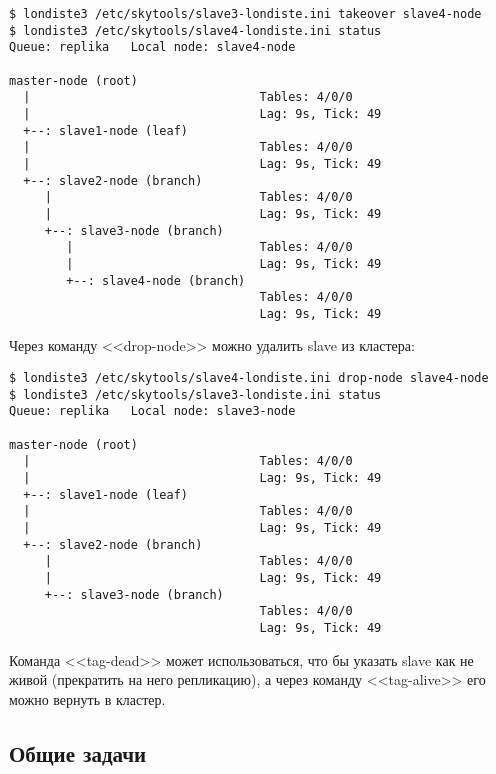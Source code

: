 \begin{lstlisting}[label=lst:londiste-cascade8,caption=Изменяем топологию]
$ londiste3 /etc/skytools/slave3-londiste.ini takeover slave4-node
$ londiste3 /etc/skytools/slave4-londiste.ini status
Queue: replika   Local node: slave4-node

master-node (root)
  |                                Tables: 4/0/0
  |                                Lag: 9s, Tick: 49
  +--: slave1-node (leaf)
  |                                Tables: 4/0/0
  |                                Lag: 9s, Tick: 49
  +--: slave2-node (branch)
     |                             Tables: 4/0/0
     |                             Lag: 9s, Tick: 49
     +--: slave3-node (branch)
        |                          Tables: 4/0/0
        |                          Lag: 9s, Tick: 49
        +--: slave4-node (branch)
                                   Tables: 4/0/0
                                   Lag: 9s, Tick: 49
\end{lstlisting}

Через команду <<drop-node>> можно удалить slave из кластера:

\begin{lstlisting}[label=lst:londiste-cascade9,caption=Удаляем ноду]
$ londiste3 /etc/skytools/slave4-londiste.ini drop-node slave4-node
$ londiste3 /etc/skytools/slave3-londiste.ini status
Queue: replika   Local node: slave3-node

master-node (root)
  |                                Tables: 4/0/0
  |                                Lag: 9s, Tick: 49
  +--: slave1-node (leaf)
  |                                Tables: 4/0/0
  |                                Lag: 9s, Tick: 49
  +--: slave2-node (branch)
     |                             Tables: 4/0/0
     |                             Lag: 9s, Tick: 49
     +--: slave3-node (branch)
                                   Tables: 4/0/0
                                   Lag: 9s, Tick: 49
\end{lstlisting}

Команда <<tag-dead>> может использоваться, что бы указать slave как не живой (прекратить на него репликацию), а через команду <<tag-alive>> его можно вернуть в кластер.




\subsection{Общие задачи}

